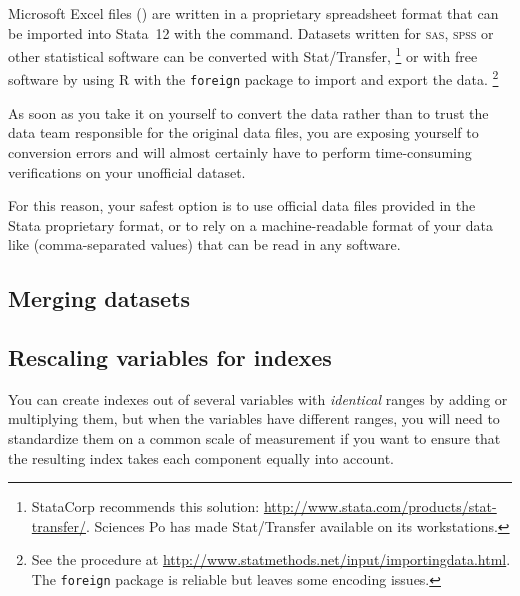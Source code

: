 Microsoft Excel files () are written in a proprietary spreadsheet format that can be imported into Stata~12 with the  command. Datasets written for \textsc{sas}, \textsc{spss} or other statistical software can be converted with Stat/Transfer,%
  \footnote{StataCorp recommends this solution: \url{http://www.stata.com/products/stat-transfer/}. Sciences Po has made Stat/Transfer available on its workstations.} %
  or with free software by using R with the \texttt{foreign} package to import and export the data.%
  \footnote{See the procedure at \url{http://www.statmethods.net/input/importingdata.html}. The \texttt{foreign} package is reliable but leaves some encoding issues.}%

As soon as you take it on yourself to convert the data rather than to trust the data team responsible for the original data files, you are exposing yourself to conversion errors and will almost certainly have to perform time-consuming verifications on your unofficial dataset.%

For this reason, your safest option is to use official data files provided in the Stata proprietary format, or to rely on a machine-readable format of your data like  (comma-separated values) that can be read in any software.%

%
\subsection{Merging datasets}
\label{sec:merge}





%
\subsection{Rescaling variables for indexes}

You can create indexes out of several variables with \emph{identical} ranges by adding or multiplying them, but when the variables have different ranges, you will need to standardize them on a common scale of measurement if you want to ensure that the resulting index takes each component equally into account.

